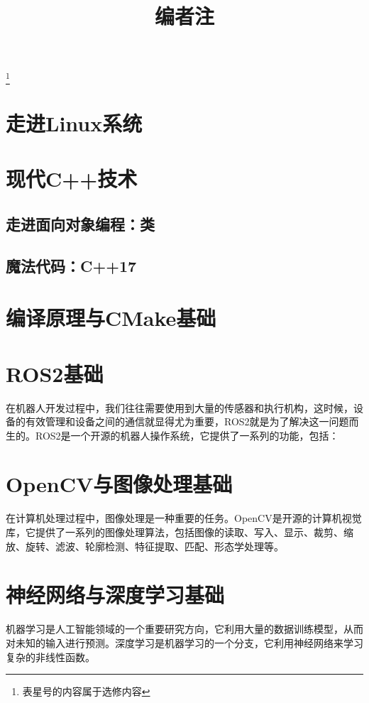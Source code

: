 \documentclass[withoutpreface,bwprint]{cumcmthesis} %
\begin{document}
\title{编者注}

\maketitle

\newpage

\tableofcontents
\footnote{表星号的内容属于选修内容}
\newpage

\section{走进Linux系统}

\section{现代C++技术}
\subsection{走进面向对象编程：类}



\subsection{魔法代码：C++17}




\section{编译原理与CMake基础}



\section{ROS2基础}
在机器人开发过程中，我们往往需要使用到大量的传感器和执行机构，这时候，设备的有效管理和设备之间的通信就显得尤为重要，ROS2就是为了解决这一问题而生的。ROS2是一个开源的机器人操作系统，它提供了一系列的功能，包括：


\section{OpenCV与图像处理基础}
在计算机处理过程中，图像处理是一种重要的任务。OpenCV是开源的计算机视觉库，它提供了一系列的图像处理算法，包括图像的读取、写入、显示、裁剪、缩放、旋转、滤波、轮廓检测、特征提取、匹配、形态学处理等。

\section{神经网络与深度学习基础}
机器学习是人工智能领域的一个重要研究方向，它利用大量的数据训练模型，从而对未知的输入进行预测。深度学习是机器学习的一个分支，它利用神经网络来学习复杂的非线性函数。
\end{document}
